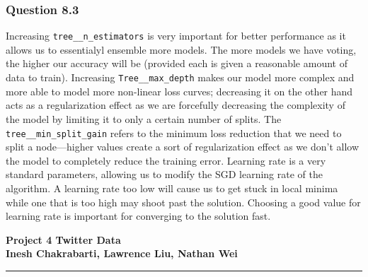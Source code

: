 \documentclass[11pt,letterpaper]{article}
\begin{document}
\subsubsection*{Question 8.3}
Increasing \texttt{tree__n_estimators} is very important for better performance as it 
allows us to essentialyl ensemble more models. The more models we have voting, the higher 
our accuracy will be (provided each is given a reasonable amount of data to train). 
Increasing \texttt{Tree__max_depth} makes our model more complex and more able to model 
more non-linear loss curves; decreasing it on the other hand acts as a regularization effect as we 
are forcefully decreasing the complexity of the model by limiting it to only a certain number of 
splits. The \texttt{tree__min_split_gain} refers to the minimum loss reduction that we need to 
split a node—higher values create a sort of regularization effect as we don't allow the model to 
completely reduce the training error. Learning rate is a very standard parameters, allowing us to modify 
the SGD learning rate of the algorithm. A learning rate too low will cause us to get stuck in local 
minima while one that is too high may shoot past the solution. Choosing a good value for learning rate is 
important for converging to the solution fast. 
\pagebreak
\begin{center}
    \begin{minipage}{10cm}
    	\begin{center}
    	\textbf{\large Project 4 Twitter Data}\\[0.1cm]
        \textbf{Inesh Chakrabarti, Lawrence Liu, Nathan Wei}\\[0.1cm]
    	\end{center}
    \end{minipage}\hfill
\end{center}
\rule{17cm}{0.1mm}




\end{document}
